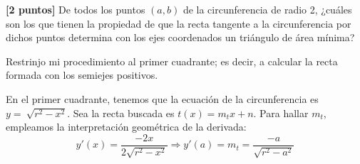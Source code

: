 \documentclass[12pt]{article}
\begin{document}
\begin{ejercicio}\textbf{[2 puntos]}
De todos los puntos $(a,b)$ de la circunferencia de radio 2, ¿cuáles son los que tienen la propiedad de que la recta tangente a la circunferencia por dichos puntos determina con los ejes coordenados un triángulo de área mínima?


Restrinjo mi procedimiento al primer cuadrante; es decir, a calcular la recta formada con los semiejes positivos.
\begin{figure}[H]
    \centering
\end{figure}

En el primer cuadrante, tenemos que la ecuación de la circunferencia es $y=~\sqrt{r^2-x^2}$. Sea la recta buscada es $t(x)=m_tx+n$. Para hallar $m_t$, empleamos la interpretación geométrica de la derivada:
\begin{equation*}
    y'(x)=\frac{-2x}{2\sqrt{r^2-x^2}} \Longrightarrow y'(a)=m_t=\frac{-a}{\sqrt{r^2-a^2}}
\end{equation*}


\end{ejercicio}
\end{document}
